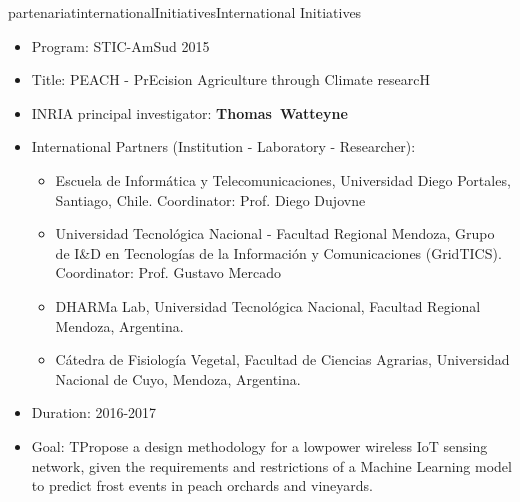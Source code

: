 \documentclass{ra2016}
\newcommand{\thomas}  {\textbf{Thomas~Watteyne}}
\begin{document}
\begin{module}{partenariat}{internationalInitiatives}{International Initiatives}
\begin{itemize}
    \item Program: STIC-AmSud 2015
    \item Title: PEACH - PrEcision Agriculture through Climate researcH
    \item INRIA principal investigator: \thomas
    \item International Partners (Institution -  Laboratory - Researcher):
        \begin{itemize}
            \item Escuela de Inform\'atica y Telecomunicaciones, Universidad Diego Portales, Santiago, Chile. Coordinator: Prof. Diego Dujovne
            \item Universidad Tecnol\'ogica Nacional - Facultad Regional Mendoza, Grupo de I\&D en Tecnologías de la Información y Comunicaciones (GridTICS). Coordinator: Prof. Gustavo Mercado
            \item DHARMa Lab, Universidad Tecnol\'ogica Nacional, Facultad Regional Mendoza, Argentina.
            \item C\'atedra de Fisiolog\'ia Vegetal, Facultad de Ciencias Agrarias, Universidad Nacional de Cuyo, Mendoza, Argentina.
        \end{itemize}
    \item Duration: 2016-2017
    \item Goal: TPropose a design methodology for a low­power wireless IoT sensing network, given the requirements and restrictions of a Machine Learning model to predict frost events in peach orchards and vineyards.
\end{itemize}


\end{module}
\end{document}
